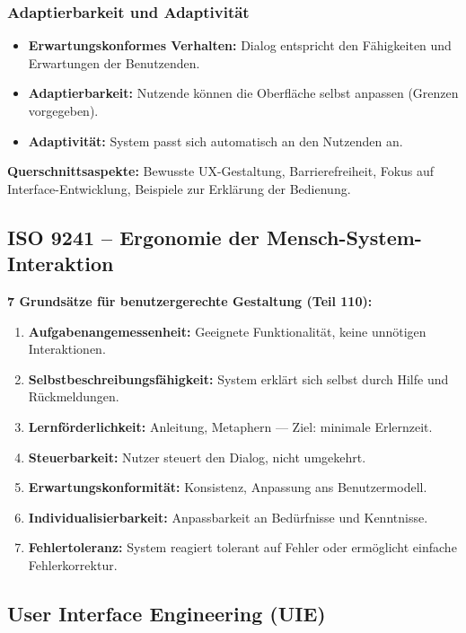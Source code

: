 \documentclass[12pt, a4paper]{article}
\begin{document}
\subsubsection*{Adaptierbarkeit und Adaptivität}
\begin{itemize}
  \item \textbf{Erwartungskonformes Verhalten:} Dialog entspricht den Fähigkeiten und Erwartungen der Benutzenden.
  \item \textbf{Adaptierbarkeit:} Nutzende können die Oberfläche selbst anpassen (Grenzen vorgegeben).
  \item \textbf{Adaptivität:} System passt sich automatisch an den Nutzenden an.
\end{itemize}

\textbf{Querschnittsaspekte:} Bewusste UX-Gestaltung, Barrierefreiheit, Fokus auf Interface-Entwicklung, Beispiele zur Erklärung der Bedienung.

\subsection{ISO 9241 -- Ergonomie der Mensch-System-Interaktion}

\textbf{7 Grundsätze für benutzergerechte Gestaltung (Teil 110):}
\begin{enumerate}
  \item \textbf{Aufgabenangemessenheit:} Geeignete Funktionalität, keine unnötigen Interaktionen.
  \item \textbf{Selbstbeschreibungsfähigkeit:} System erklärt sich selbst durch Hilfe und Rückmeldungen.
  \item \textbf{Lernförderlichkeit:} Anleitung, Metaphern — Ziel: minimale Erlernzeit.
  \item \textbf{Steuerbarkeit:} Nutzer steuert den Dialog, nicht umgekehrt.
  \item \textbf{Erwartungskonformität:} Konsistenz, Anpassung ans Benutzermodell.
  \item \textbf{Individualisierbarkeit:} Anpassbarkeit an Bedürfnisse und Kenntnisse.
  \item \textbf{Fehlertoleranz:} System reagiert tolerant auf Fehler oder ermöglicht einfache Fehlerkorrektur.
\end{enumerate}

\subsection{User Interface Engineering (UIE)}
\end{document}
